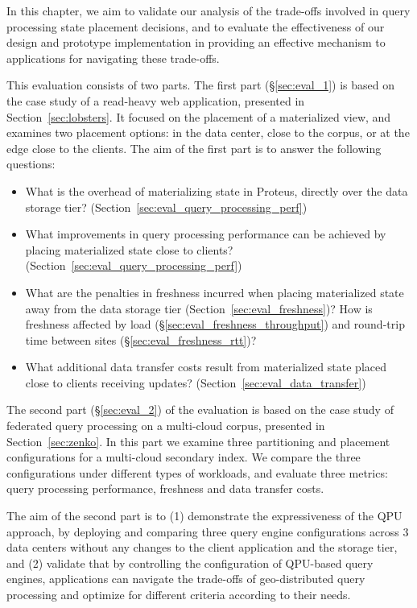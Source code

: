 In this chapter, we aim to validate our analysis of the trade-offs involved in query processing state placement decisions,
and to evaluate the effectiveness of our design and prototype implementation in providing an effective mechanism to applications
for navigating these trade-offs.

This evaluation consists of two parts.
The first part (\S\ref{sec:eval_1}) is based on the case study of a read-heavy web application, presented in Section~\ref{sec:lobsters}.
It focused on the placement of a materialized view,
and examines two placement options: in the data center, close to the corpus, or at the edge close to the clients.
The aim of the first part is to answer the following questions:

\begin{itemize}

  \item What is the overhead of materializing state in Proteus, directly over the data storage tier?
  (Section~\ref{sec:eval_query_processing_perf})

  \item What improvements in query processing performance can be achieved by placing materialized state close to clients?
  (Section~\ref{sec:eval_query_processing_perf})

  \item What are the penalties in freshness incurred when placing materialized state away from the data storage tier
  (Section~\ref{sec:eval_freshness})?
  How is freshness affected by load (\S\ref{sec:eval_freshness_throughput}) and round-trip time between
  sites (\S\ref{sec:eval_freshness_rtt})?

  \item What additional data transfer costs result from materialized state placed close to clients receiving updates?
  (Section~\ref{sec:eval_data_transfer})

\end{itemize}

The second part (\S\ref{sec:eval_2}) of the evaluation is based on the case study of federated query processing on a multi-cloud
corpus, presented in Section~\ref{sec:zenko}.
In this part we examine three partitioning and placement configurations for a multi-cloud secondary index.
We compare the three configurations under different types of workloads, and evaluate three metrics:
query processing performance, freshness and data transfer costs.

The aim of the second part is to (1) demonstrate the expressiveness of the QPU approach,
by deploying and comparing three query engine configurations across 3 data centers without any changes to the client application and the storage tier,
and (2) validate that by controlling the configuration of QPU-based query engines,
applications can navigate the trade-offs of geo-distributed query processing and optimize for different criteria according to their needs.


